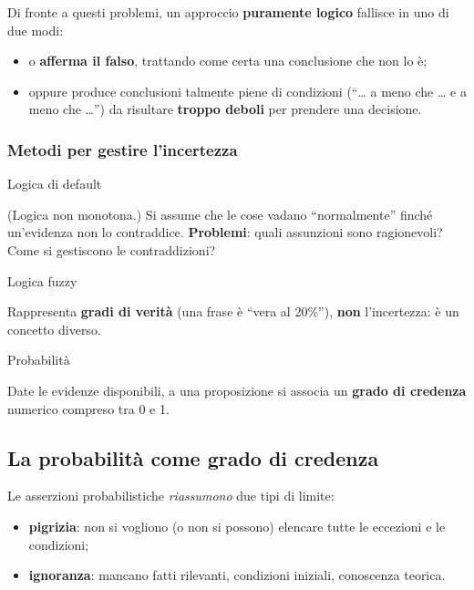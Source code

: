 \documentclass[11pt, a4paper]{article}
\renewcommand{\emph}[1]{\textcolor{verdechiaro}{\itshape #1}}
\begin{document}
Di fronte a questi problemi, un approccio \textbf{puramente logico} fallisce in uno di due modi:
\begin{itemize}
  \item o \textbf{afferma il falso}, trattando come certa una conclusione che non lo è;
  \item oppure produce conclusioni talmente piene di condizioni (``\dots{} a meno che \dots{} e a meno che \dots'') da risultare \textbf{troppo deboli} per prendere una decisione.
\end{itemize}

\subsubsection*{Metodi per gestire l'incertezza}

\begin{tcbraster}[raster columns=3, raster equal height, raster column skip=10pt, raster before skip=8pt, raster after skip=10pt]
  \begin{defbox}{Logica di default}
    \raggedright
    (Logica non monotona.) Si assume che le cose vadano ``normalmente'' finché un'evidenza non lo contraddice.
    \textbf{Problemi}: quali assunzioni sono ragionevoli? Come si gestiscono le contraddizioni?
  \end{defbox}
  \begin{defbox}{Logica fuzzy}
    \raggedright
    Rappresenta \textbf{gradi di verità} (una frase è ``vera al 20\%''), \textbf{non} l'incertezza: è un concetto diverso.
  \end{defbox}
  \begin{defbox}{Probabilità}
    \raggedright
    Date le evidenze disponibili, a una proposizione si associa un \textbf{grado di credenza} numerico compreso tra 0 e 1.
  \end{defbox}
\end{tcbraster}

\subsection{La probabilità come grado di credenza}

Le asserzioni probabilistiche \emph{riassumono} due tipi di limite:
\begin{itemize}
  \item \textbf{pigrizia}: non si vogliono (o non si possono) elencare tutte le eccezioni e le condizioni;
  \item \textbf{ignoranza}: mancano fatti rilevanti, condizioni iniziali, conoscenza teorica.
\end{itemize}
\end{document}
